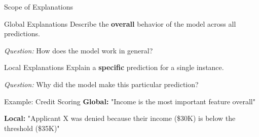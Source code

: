 \documentclass[aspectratio=169]{beamer}
\begin{document}
\begin{frame}{Scope of Explanations}
  \begin{definitionbox}{Global Explanations}
    Describe the \textbf{overall} behavior of the model across all predictions.

    \textit{Question:} How does the model work in general?
  \end{definitionbox}

  \vspace{0.5em}

  \begin{definitionbox}{Local Explanations}
    Explain a \textbf{specific} prediction for a single instance.

    \textit{Question:} Why did the model make this particular prediction?
  \end{definitionbox}

  \vspace{0.5em}

  \begin{examplebox}{Example: Credit Scoring}
    \textbf{Global:} "Income is the most important feature overall"

    \textbf{Local:} "Applicant X was denied because their income (\$30K) is below the threshold (\$35K)"
  \end{examplebox}
\end{frame}
\end{document}
